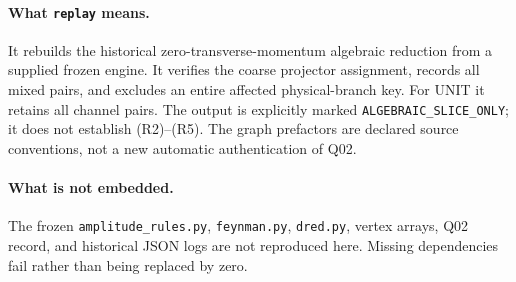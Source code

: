 \documentclass[11pt,a4paper]{article}
\newcommand{\loc}[1]{\nolinkurl{#1}}
\theoremstyle{plain}
\theoremstyle{definition}
\theoremstyle{remark}
\numberwithin{equation}{section}
\begin{document}
\paragraph{What \loc{replay} means.}
It rebuilds the historical zero-transverse-momentum algebraic
reduction from a supplied frozen engine. It verifies the coarse
projector assignment, records all mixed pairs, and excludes an
entire affected physical-branch key.
For UNIT it retains all channel pairs.
The output is explicitly marked
\loc{ALGEBRAIC_SLICE_ONLY}; it does not establish (R2)--(R5).
The graph prefactors are declared source conventions, not a
new automatic authentication of Q02.

\paragraph{What is not embedded.}
The frozen \loc{amplitude_rules.py}, \loc{feynman.py},
\loc{dred.py}, vertex arrays, Q02 record, and historical JSON
logs are not reproduced here. Missing dependencies fail rather
than being replaced by zero.
\end{document}
